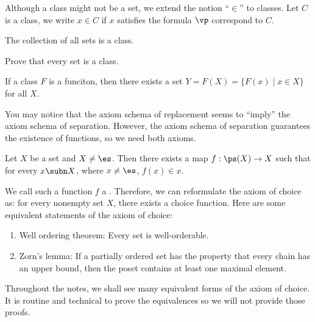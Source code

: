 \documentclass[10pt]{article}
\begin{document}
\begin{remark}
    Although a class might not be a set, we extend the notion ``$\in$'' to classes. Let $C$ is a class, we write $x\in C$ if $x$ satisfies the formula $\vp$ correspond to $C$.
\end{remark}
\begin{example}
    The collection of all sets is a class.
\end{example}
\begin{problem}
    Prove that every set is a class.
\end{problem}
\begin{Axiom schema of replacement}
    If a class $F$ is a funciton, then there exists a set $Y=F(X)=\{F(x)\mid x\in X\}$ for all $X$.
\end{Axiom schema of replacement}
\par
You may notice that the axiom schema of replacement seems to ``imply'' the axiom schema of separation. However, the axiom schema of separation guarantees the existence of functions, so we need both axioms.
\begin{Axiom of choice}
    Let $X$ be a set and $X\ne\es$. Then there exists a map $f:\ps(X)\to X$ such that for every $x\subn X$, where $x\ne\es$, $f(x)\in x$. 
\end{Axiom of choice}
\par
We call such a function $f$ a . Therefore, we can reformulate the axiom of choice as: for every nonempty set $X$, there exists a choice function. Here are some equivalent statements of the axiom of choice:
\begin{enumerate}
    \item Well ordering theorem: Every set is well-orderable.
    \item Zorn's lemma: If a partially ordered set has the property that every chain has an upper bound, then the poset contains at least one maximal element.
\end{enumerate}
\begin{remark}
    Throughout the notes, we shall see many equivalent forms of the axiom of choice. It is routine and technical to prove the equivalences so we will not provide those proofs.
\end{remark}
\end{document}
